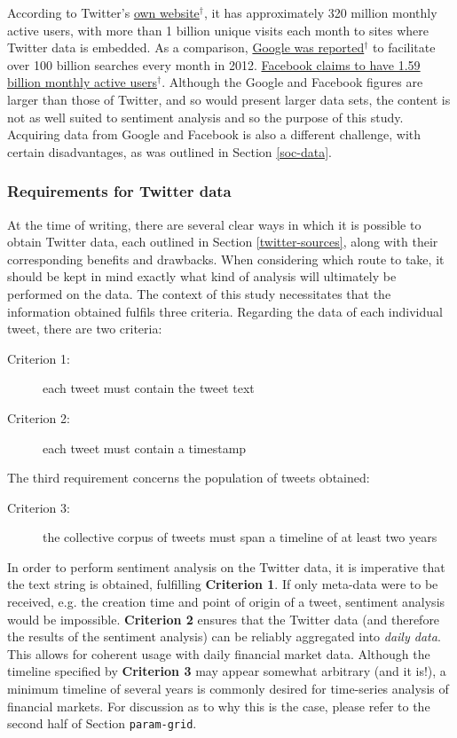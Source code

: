 \documentclass{article}
\begin{document}
According to Twitter's \href{https://about.twitter.com/company}{own website$^{\dag{}}$}, it has approximately 320 million monthly active users, with more than 1 billion unique visits each month to sites where Twitter data is embedded. As a comparison, \href{http://www.internetlivestats.com/google-search-statistics/}{Google was reported$^{\dag{}}$} to facilitate over 100 billion searches every month in 2012. \href{http://newsroom.fb.com/company-info/}{Facebook claims to have 1.59 billion monthly active users$^{\dag{}}$}. Although the Google and Facebook figures are larger than those of Twitter, and so would present larger data sets, the content is not as well suited to sentiment analysis and so the purpose of this study. Acquiring data from Google and Facebook is also a different challenge, with certain disadvantages, as was outlined in Section \ref{soc-data}.


\subsubsection{Requirements for Twitter data \label{criteria}}
\label{sec-1-2-2}

At the time of writing, there are several clear ways in which it is possible to obtain Twitter data, each outlined in Section \ref{twitter-sources}, along with their corresponding benefits and drawbacks. When considering which route to take, it should be kept in mind exactly what kind of analysis will ultimately be performed on the data. The context of this study necessitates that the information obtained fulfils three criteria. Regarding the data of each individual tweet, there are two criteria:

\begin{description}
\item[{Criterion 1:}] each tweet must contain the tweet text

\item[{Criterion 2:}] each tweet must contain a timestamp
\end{description}

The third requirement concerns the population of tweets obtained:

\begin{description}
\item[{Criterion 3:}] the collective corpus of tweets must span a timeline of at least two years
\end{description}

In order to perform sentiment analysis on the Twitter data, it is imperative that the text string is obtained, fulfilling \textbf{Criterion 1}. If only meta-data were to be received, e.g. the creation time and point of origin of a tweet, sentiment analysis would be impossible. \textbf{Criterion 2} ensures that the Twitter data (and therefore the results of the sentiment analysis) can be reliably aggregated into \emph{daily data}. This allows for coherent usage with daily financial market data. Although the timeline specified by \textbf{Criterion 3} may appear somewhat arbitrary (and it is!), a minimum timeline of several years is commonly desired for time-series analysis of financial markets. For discussion as to why this is the case, please refer to the second half of Section \texttt{param-grid}.
\end{document}
